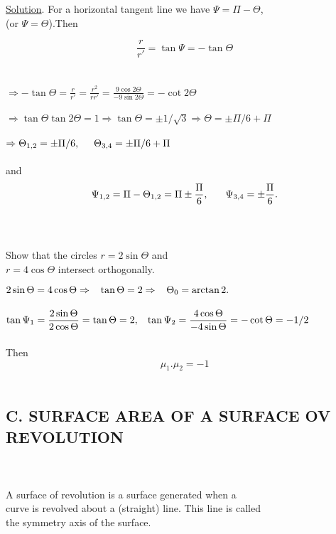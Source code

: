 \documentclass[a4paper,11pt]{amsbook}
\begin{document}
\underline{Solution}. For a horizontal tangent line we have $\Psi=\Pi-\Theta$,\\
(or $\Psi=\Theta$).Then

$$\displaystyle\frac{r}{r'}=\tan\Psi=-\tan\Theta$$\\
\\
$\Rightarrow \displaystyle -\tan\Theta=\frac{r}{r'}=\frac{r^2}{rr'}=\frac{9\cos{2\Theta}}{-9\sin{2\Theta}}=-\cot{2\Theta}$\\
\\
$\Rightarrow \tan\Theta\tan{2\Theta}=1 \Rightarrow \tan\Theta=\pm1/\sqrt{3}\Rightarrow\Theta=\pm\Pi/6+\Pi$\\
\\
$\Rightarrow \displaystyle\Theta_{1,2}=\pm\Pi/6, \hspace{5mm}\Theta_{3,4}=\pm\Pi/6+\Pi$\\
\\
and
\\
$$\displaystyle \Psi_{1,2}=\Pi-\Theta_{1,2}=\Pi\pm\frac{\Pi}{6},\hspace{6mm}\Psi_{3,4}=\pm\frac{\Pi}{6}.$$\\
\\
\begin{exmp}
 Show that the circles $r=2\sin\Theta $ and\\
$r=4\cos\Theta$ intersect orthogonally.\\
\end{exmp}


\begin{hSolution}$2\sin\Theta=4\cos\Theta \Rightarrow \hspace{3mm} \tan\Theta=2 \Rightarrow \hspace{3mm}\Theta_0=\arctan2.$\\
\\
$\displaystyle\tan\Psi_1=\frac{2\sin\Theta}{2\cos\Theta}=\tan\Theta=2,\hspace{3mm} \tan\Psi_2=\frac{4\cos\Theta}{-4\sin\Theta}=-\cot\Theta=-1/2$\\
\\
Then
\\
$$\mu_1.\mu_2=-1$$\\
\end{hSolution}


\subsection*{C. SURFACE AREA OF A SURFACE OV REVOLUTION}
\mbox{ }\\
\\
A surface of revolution is a surface generated when a\\
curve is revolved about a (straight) line. This line is called\\
the symmetry axis of the surface.\\
\end{document}
